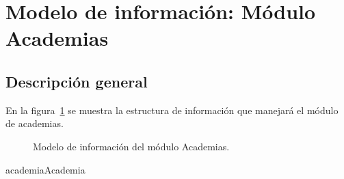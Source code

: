 
%

\newpage
\section{Modelo de información: Módulo Academias}
\subsection{Descripción general}
En la figura~\ref{fig:academias} se muestra la estructura de información que manejará el módulo de academias.

\begin{figure}[htbp!]
	\begin{center}
		\caption{Modelo de información del módulo Academias.}
		\label{fig:academias}
	\end{center}
\end{figure}

\begin{BusinessEntity}{academia}{Academia}
	

\end{BusinessEntity}



